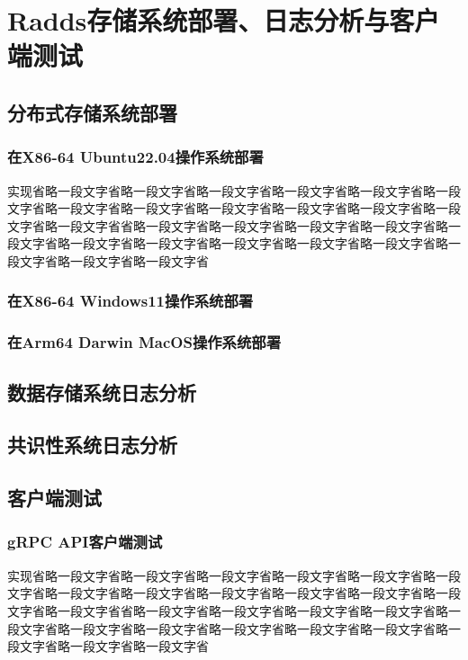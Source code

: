 \section{Radds存储系统部署、日志分析与客户端测试}
	\subsection{分布式存储系统部署}
	\subsubsection{在X86-64 Ubuntu22.04操作系统部署}
	实现省略一段文字省略一段文字省略一段文字省略一段文字省略一段文字省略一段文字省略一段文字省略一段文字省略一段文字省略一段文字省略一段文字省略一段文字省略一段文字省省略一段文字省略一段文字省略一段文字省略一段文字省略一段文字省略一段文字省略一段文字省略一段文字省略一段文字省略一段文字省略一段文字省略一段文字省略一段文字省
	\subsubsection{在X86-64 Windows11操作系统部署}
	\subsubsection{在Arm64 Darwin MacOS操作系统部署}
	
	\subsection{数据存储系统日志分析}
	\subsection{共识性系统日志分析}

	\subsection{客户端测试}
	
	\subsubsection{gRPC API客户端测试}
	
	实现省略一段文字省略一段文字省略一段文字省略一段文字省略一段文字省略一段文字省略一段文字省略一段文字省略一段文字省略一段文字省略一段文字省略一段文字省略一段文字省省略一段文字省略一段文字省略一段文字省略一段文字省略一段文字省略一段文字省略一段文字省略一段文字省略一段文字省略一段文字省略一段文字省略一段文字省略一段文字省


